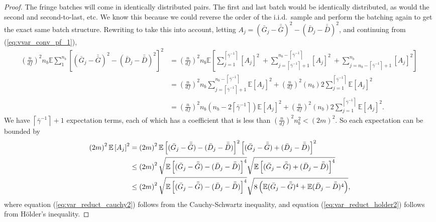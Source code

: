 \documentclass[12pt]{article}
\newcommand{\e}[1]{\mathbb{E} %
#1 %
}
\newcommand{\gammab}{\bar{\gamma}}
\newcommand{\gb}{\bar{G}}
\newcommand{\gbb}{\bar{\gb}}
\newcommand{\db}{\bar{D}}
\newcommand{\dbb}{\bar{\db}}
\begin{document}
\begin{proof}
	The fringe batches will come in identically distributed pairs.  
        The first and last batch would be identically distributed, as would the second and second-to-last, etc.  
        We know this because we could reverse the order of the i.i.d.\ sample and perform the batching again to get the exact same batch structure.  
        Rewriting to take this into account, letting $A_j = (\gb_j - \gbb)^2 - (\db_j - \dbb)^2$, and continuing from (\ref{eq:vvar_conv_pf_1}),
	\begin{align*}
		\left( \frac{n}{df} \right)^2 n_b \e{ \sum_{1}^{n_b} \left[ (\gb_j - \gbb)^2 - (\db_j - \dbb)^2 \right]^2 } & = \left( \frac{n}{df} \right)^2 n_b \e{\left[ \sum_{j=1}^{\left\lceil \gammab^{-1} \right\rceil} \left[ A_j \right]^2 \
		 + \sum_{j=\left\lceil \gammab^{-1} \right\rceil+1}^{n_b-\left\lceil \gammab^{-1} \right\rceil} \left[ A_j \right]^2 \
		 + \sum_{j=n_b-\left\lceil \gammab^{-1} \right\rceil+1}^{n_b} \left[ A_j \right]^2 \right]\
		} \\
		& = \left( \frac{n}{df} \right)^2 n_b \sum_{j=\left\lceil \gammab^{-1} \right\rceil+1}^{n_b-\left\lceil \gammab^{-1} \right\rceil} \e{ \left[ A_j \right]^2 } + \left( \frac{n}{df} \right)^2 (n_b) 2\sum_{j=1}^{\left\lceil \gammab^{-1} \right\rceil} \e{ \left[ A_j \right]^2 } \\
		& = \left( \frac{n}{df} \right)^2 n_b \left(n_b - 2\left\lceil \gammab^{-1} \right\rceil \right) \e{ \left[ A_j \right]^2 }
		+ \left( \frac{n}{df} \right)^2 (n_b) 2\sum_{j=1}^{\left\lceil \gammab^{-1} \right\rceil} \e{ \left[ A_j \right]^2 }.
	\end{align*}	
	We have $\left\lceil \gammab^{-1} \right\rceil + 1$ expectation terms, each of which has a coefficient that is less than $\left(\frac{n}{df}\right)^2n_b^2 < (2m)^2$.  
        So each expectation can be bounded by
	\begin{align}
		\left( 2m \right)^2 \e{ \left[ A_j \right]^2 } & = \left( 2m \right)^2 \e{ \left[(\gb_j - \gbb) - (\db_j - \dbb)\right]^2 \left[(\gb_j - \gbb) + (\db_j - \dbb)\right]^2 } \notag \\
		& \leq \left( 2m \right)^2 \sqrt{\e{\left[(\gb_j - \gbb) - (\db_j - \dbb)\right]^4}} \sqrt{\e{\left[(\gb_j - \gbb) + (\db_j - \dbb)\right]^4 }} \label{eq:var_reduct_cauchy2} \\
		& \leq \left( 2m \right)^2 \sqrt{\e{\left[(\gb_j - \gbb) - (\db_j - \dbb)\right]^4}} \sqrt{8 \left(\e{(\gb_j - \gbb)^4} + \e{(\db_j - \dbb)^4} \right)}, \label{eq:var_reduct_holder2}
	\end{align}
	where equation (\ref{eq:var_reduct_cauchy2}) follows from the Cauchy-Schwartz inequality, and equation (\ref{eq:var_reduct_holder2}) follows from H\"{o}lder's inequality.  

\end{proof}
\end{document}
